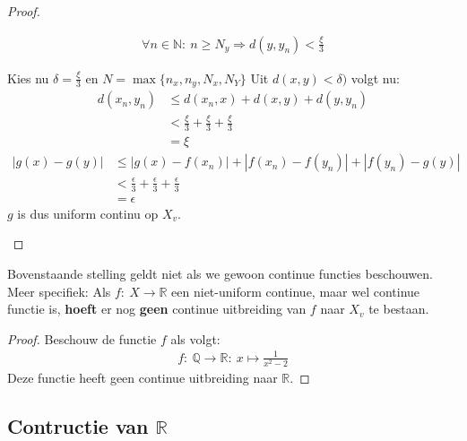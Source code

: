 \documentclass[main.tex]{subfiles}
\begin{document}
\begin{st}
\begin{proof}
\begin{itemize}
\begin{itemize}
\begin{itemize}
\begin{align*}
            \forall n\in\mathbb{N}:\ n\ge N_{y}\Rightarrow d(y,y_{n}) < \frac{\xi}{3}
          \end{align*}
        \end{itemize}
        Kies nu $\delta = \frac{\xi}{3}$ en $N = \max\{n_{x},n_{y},N_{x},N_{Y}\}$
        Uit $d(x,y)<\delta)$ volgt nu:
        \begin{align*}
          d(x_{n},y_{n})
          &\le d(x_{n},x) + d(x,y) + d(y,y_{n})\\
          &< \frac{\xi}{3} + \frac{\xi}{3} + \frac{\xi}{3}\\
          &= \xi
        \end{align*}
        \begin{align*}
          |g(x)-g(y)|
          &\le |g(x)-f(x_{n})| + |f(x_{n})-f(y_{n})| + |f(y_{n})-g(y)|\\
          &< \frac{\epsilon}{3} + \frac{\epsilon}{3} + \frac{\epsilon}{3}\\
          &= \epsilon
        \end{align*}
        $g$ is dus uniform continu op $X_{v}$.
      \end{itemize}
    \end{itemize}
  \end{proof}
\end{st}

\begin{tvb}
  Bovenstaande stelling geldt niet als we gewoon continue functies beschouwen.
  Meer specifiek: Als $f:\ X \rightarrow \mathbb{R}$ een niet-uniform continue, maar wel continue functie is, \textbf{hoeft} er nog \textbf{geen} continue uitbreiding van $f$ naar $X_{v}$ te bestaan.

  \begin{proof}
    Beschouw de functie $f$ als volgt:
    \begin{align*}
      f:\ \mathbb{Q} \rightarrow \mathbb{R}:\ x \mapsto \frac{1}{x^{2}-2}
    \end{align*}
    Deze functie heeft geen continue uitbreiding naar $\mathbb{R}$.
  \end{proof}
\end{tvb}


\subsection{Contructie van $\mathbb{R}$}
\label{sec:contr-van-mathbbr}

\end{document}
